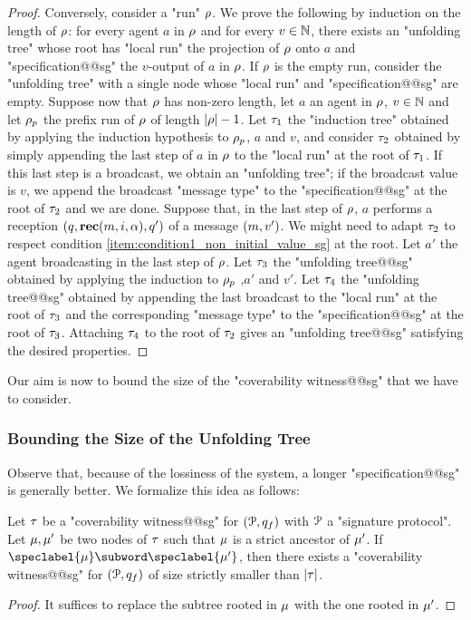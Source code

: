 \begin{proof}
Conversely, consider a "run" $\rho$. We prove the following by induction on the length of $\rho$: for every agent $a$ in $\rho$ and for every $v \in \mathbb{N}$, there exists an "unfolding tree" whose root has "local run" the projection of $\rho$ onto $a$ and "specification@@sg" the $v$-output of $a$ in $\rho$. If $\rho$ is the empty run, consider the "unfolding tree" with a single node whose "local run" and "specification@@sg" are empty. Suppose now that $\rho$ has non-zero length, let $a$ an agent in $\rho$, $v \in \mathbb{N}$ and let $\rho_p$ the prefix run of $\rho$ of length $|\rho|-1$.
Let $\tau_1$ the "induction tree" obtained by applying the induction hypothesis to $\rho_p$, $a$ and $v$, and consider $\tau_2$ obtained by simply appending the last step of $a$ in $\rho$ to the "local run" at the root of $\tau_1$. If this last step is a broadcast, we obtain an "unfolding tree"; if the broadcast value is $v$, we append the broadcast "message type" to the "specification@@sg" at the root of $\tau_2$ and we are done. 
Suppose that, in the last step of $\rho$, $a$ performs a reception $(q, \textbf{rec}(m, i, \alpha),q')$ of a message $(m,v')$. We might need to adapt $\tau_2$ to respect condition \ref{item:condition1_non_initial_value_sg} at the root. Let $a'$ the agent broadcasting in the last step of $\rho$. Let $\tau_3$ the "unfolding tree@@sg" obtained by applying the induction to $\rho_p$ ,$a'$ and $v'$. Let $\tau_4$ the "unfolding tree@@sg" obtained by appending the last broadcast to the "local run" at the root of $\tau_3$ and the corresponding "message type" to the "specification@@sg" at the root of $\tau_3$. Attaching $\tau_4$ to the root of $\tau_2$ gives an "unfolding tree@@sg" satisfying the desired properties. 
\end{proof}

Our aim is now to bound the size of the "coverability witness@@sg" that we have to consider.

\subsubsection{Bounding the Size of the Unfolding Tree}
Observe that, because of the lossiness of the system, a longer "specification@@sg" is generally better. We formalize this idea as follows:

\begin{lemma}
\label{lem:no_subword_in_branch_sg}
Let $\tau$ be a "coverability witness@@sg" for $(\mathcal{P},q_f)$ with $\mathcal{P}$ a "signature protocol". Let $\mu, \mu'$ be two nodes of $\tau$ such that $\mu$ is a strict ancestor of $\mu'$. If $\speclabel{\node} \subword \speclabel{\node'}$, then there exists a "coverability witness@@sg" for $(\mathcal{P}, q_f)$ of size strictly smaller than $|\tau|$.
\end{lemma}
\begin{proof}
It suffices to replace the subtree rooted in $\mu$ with the one rooted in $\mu'$.
\end{proof}

